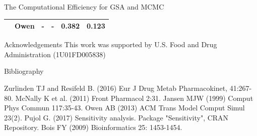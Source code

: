 \documentclass[xcolor=table]{beamer}
\begin{document}
\begin{frame}[t]
\begin{columns}[t]
\begin{column}{0.22\paperwidth}
\begin{block}{The Computational Efficiency for GSA and MCMC}
\begin{table}
\begin{adjustbox}{max width=\textwidth}
\begin{threeparttable}
\begin{tabular}{llcccc}
	    & Owen & - & - & 0.382 & 0.123 \\
    \hline   
  \end{tabular}
   \end{threeparttable} 
   \end{adjustbox}
\end{table}
\end{block}
%
\begin{block}{Acknowledgements}
\small This work was supported by U.S. Food and Drug Administration (1U01FD005838) \\
\end{block}
%
\begin{alertblock}{Bibliography}
\begin{thebibliography}{9}
{\footnotesize {}
Zurlinden TJ and Resifeld B. (2016) Eur J Drug Metab Pharmacokinet, 41:267-80.}
{\footnotesize {}
McNally K et al. (2011) Front Pharmacol 2:31.}
{\footnotesize {}
Jansen MJW (1999) Comput Phys Commun 117:35-43.}
{\footnotesize {}
Owen AB (2013) ACM Trans Model Comput Simul 23(2).}
{\footnotesize {}
Pujol G. (2017) Sensitivity analysis. Package "Sensitivity", CRAN Repository.}
{\footnotesize {}
Bois FY (2009) Bioinformatics 25: 1453-1454.}
\end{thebibliography}
\end{alertblock}


\end{column} %

\end{columns} %

\end{frame} %
\end{document}
